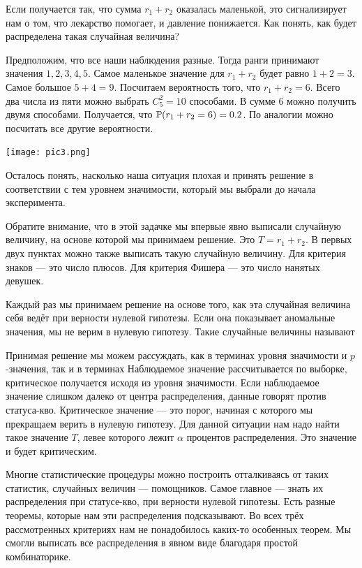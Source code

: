 \documentclass[12pt, a4paper, oneside]{article}
\begin{document}
Если получается так, что сумма $r_1 + r_2$ оказалась маленькой, это сигнализирует нам о том, что лекарство помогает, и давление понижается. Как понять, как будет распределена такая случайная величина? 

Предположим, что все наши наблюдения разные. Тогда ранги принимают значения $1,2,3,4,5$. Самое маленькое значение для $r_1 + r_2$ будет равно $1 + 2 = 3.$ Самое большое $5 + 4 = 9$. Посчитаем вероятность того, что $r_1 + r_2 = 6.$ Всего два числа из пяти можно выбрать $C_5^2 = 10$ способами. В сумме $6$ можно получить двумя способами. Получается, что $\mathbb{P}(r_1 + r_2 = 6) = 0.2$. По аналогии можно посчитать все другие вероятности. 

\begin{center} 
\texttt{[image: pic3.png]}
\end{center} 

Осталось понять, насколько наша ситуация плохая и принять решение в соответствии с тем уровнем значимости, который мы выбрали до начала эксперимента. 

Обратите внимание, что в этой задачке мы впервые явно выписали случайную величину, на основе которой мы принимаем решение. Это $T = r_1 + r_2$. В первых двух пунктах можно также выписать такую случайную величину. Для критерия знаков --- это число плюсов. Для критерия Фишера --- это число нанятых девушек. 

Каждый раз мы принимаем решение на основе того, как эта случайная величина себя ведёт при верности нулевой гипотезы. Если она показывает аномальные значения, мы не верим в нулевую гипотезу. Такие случайные величины называют  

Принимая решение мы можем рассуждать, как в терминах уровня значимости и $p$-значения, так и в терминах    Наблюдаемое значение рассчитывается по выборке, критическое получается исходя из уровня значимости. Если наблюдаемое значение слишком далеко от центра распределения, данные говорят против статуса-кво. Критическое значение --- это порог, начиная с которого мы прекращаем верить в нулевую гипотезу. Для данной ситуации нам надо найти такое значение $T$, левее которого лежит $\alpha$ процентов распределения. Это значение и будет критическим. 

Многие статистические процедуры можно построить отталкиваясь от таких статистик,  случайных величин --- помощников. Самое главное --- знать их распределения при статусе-кво, при верности нулевой гипотезы. Есть разные теоремы, которые нам эти распределения подсказывают. Во всех трёх рассмотренных критериях нам не понадобилось каких-то особенных теорем. Мы смогли выписать все распределения в явном виде благодаря простой комбинаторике. 
\end{document}
